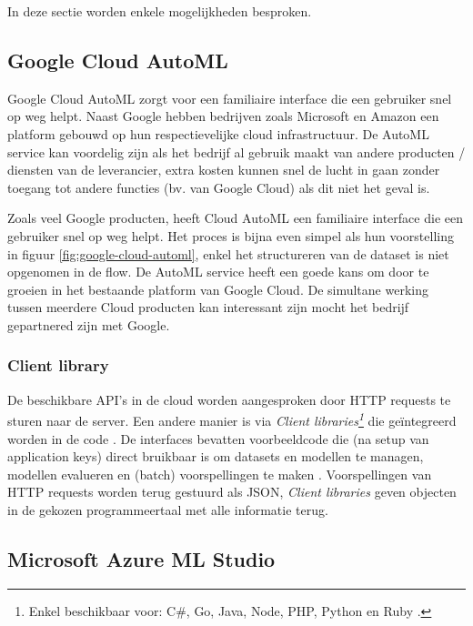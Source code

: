 In deze sectie worden enkele mogelijkheden besproken.

\subsection{Google Cloud AutoML}
\label{subsec:google-automl}

Google Cloud AutoML zorgt voor een familiaire interface die een gebruiker snel op weg helpt. Naast Google hebben bedrijven zoals Microsoft en Amazon een platform gebouwd op hun respectievelijke cloud infrastructuur. De AutoML service kan voordelig zijn als het bedrijf al gebruik maakt van andere producten / diensten van de leverancier, extra kosten kunnen snel de lucht in gaan zonder toegang tot andere functies (bv. van Google Cloud) als dit niet het geval is. 

Zoals veel Google producten, heeft Cloud AutoML een familiaire interface die een gebruiker snel op weg helpt. Het proces is bijna even simpel als hun voorstelling in figuur \ref{fig:google-cloud-automl}, enkel het structureren van de dataset is niet opgenomen in de flow. De AutoML service heeft een goede kans om door te groeien in het bestaande platform van Google Cloud. De simultane werking tussen meerdere Cloud producten kan interessant zijn mocht het bedrijf gepartnered zijn met Google.

\subsubsection{Client library}
\label{subsubsec:client-library}

De beschikbare API's in de cloud worden aangesproken door HTTP requests te sturen naar de server. Een andere manier is via \textit{Client libraries\footnote{Enkel beschikbaar voor: C\#, Go, Java, Node, PHP, Python en Ruby \autocite{GoogleCLV2020}.}} die geïntegreerd worden in de code \autocite{GoogleCL2020}. De interfaces bevatten voorbeeldcode die (na setup van application keys) direct bruikbaar is om datasets en modellen te managen, modellen evalueren en (batch) voorspellingen te maken \autocite{GoogleCLV2020}. Voorspellingen van HTTP requests worden terug gestuurd als JSON, \textit{Client libraries} geven objecten in de gekozen programmeertaal met alle informatie terug.

\subsection{Microsoft Azure ML Studio}
\label{subsec:ml-studio}


